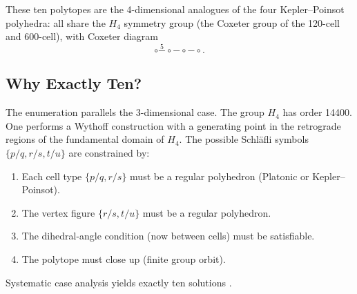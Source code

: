 \begin{table}[h]
\centering
\caption{The ten regular star 4-polytopes (Coxeter 1933).}
\label{tab:star-4-polytopes}
\end{table}

These ten polytopes are the 4-dimensional analogues of the
four Kepler–Poinsot polyhedra: all share the $H_4$ symmetry
group (the Coxeter group of the 120-cell and 600-cell), with
Coxeter diagram
\[
  \circ \overset{5}{-} \circ \overset{}{-} \circ \overset{}{-} \circ .
\]

\subsection{Why Exactly Ten?}
\label{ssec:why-ten}

The enumeration parallels the 3-dimensional case.  The group
$H_4$ has order 14400.  One performs a Wythoff construction
with a generating point in the retrograde regions of the
fundamental domain of $H_4$.  The possible Schläfli symbols
$\{p/q, r/s, t/u\}$ are constrained by:
\begin{enumerate}
  \item Each cell type $\{p/q, r/s\}$ must be a regular polyhedron
        (Platonic or Kepler–Poinsot).
  \item The vertex figure $\{r/s, t/u\}$ must be a regular polyhedron.
  \item The dihedral-angle condition (now between cells) must
        be satisfiable.
  \item The polytope must close up (finite group orbit).
\end{enumerate}
Systematic case analysis yields exactly ten solutions
\cite{coxeter_regular_polytopes}.

